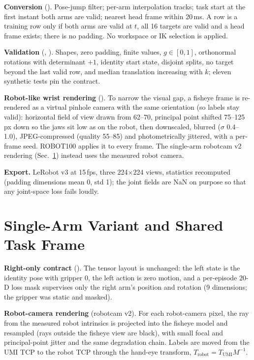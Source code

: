 \documentclass[conference,10pt]{IEEEtran}
\begin{document}
\textbf{Conversion} (). Pose-jump filter; per-arm interpolation tracks; task start at the first instant both arms
are valid; nearest head frame within 20\,ms. A row is a training row only if both arms are valid at $t$, all 16 targets are valid
and a head frame exists; there is no padding. No workspace or IK selection is applied.

\textbf{Validation} (, ). Shapes, zero padding, finite values, $g\in[0,1]$, orthonormal rotations with
determinant $+1$, identity start state, disjoint splits, no target beyond the last valid row, and median translation increasing with
$k$; eleven synthetic tests pin the contract.

\textbf{Robot-like wrist rendering} (). To narrow the visual gap, a fisheye frame is
re-rendered as a virtual pinhole camera with the same orientation (so labels stay valid): horizontal field of view drawn from
62--70\textdegree, principal point shifted 75--125\,px down so the jaws sit low as on the robot, then downscaled, blurred
($\sigma$ 0.4--1.0), JPEG-compressed (quality 55--85) and photometrically jittered, with a per-frame seed. ROBOT100 applies it to
every frame. The single-arm robotcam v2 rendering (Sec.~\ref{m:sec:hra}) instead uses the measured robot camera.

\textbf{Export.} LeRobot v3 at 15\,fps, three 224$\times$224 views, statistics recomputed (padding dimensions mean 0, std 1); the
joint fields are NaN on purpose so that any joint-space loss fails loudly.

\section{Single-Arm Variant and Shared Task Frame}\label{m:sec:hra}
\textbf{Right-only contract} (). The tensor layout is unchanged: the left state is the identity pose with
gripper 0, the left action is zero motion, and a per-episode 20-D loss mask supervises only the right arm's position and rotation
(9 dimensions; the gripper was static and masked).

\textbf{Robot-camera rendering} (robotcam v2). For each robot-camera pixel, the ray from the measured robot intrinsics is projected
into the fisheye model and resampled (rays outside the fisheye view are black), with small focal and principal-point jitter and the
same degradation chain. Labels are moved from the UMI TCP to the robot TCP through the hand-eye transform, $T_\text{robot}=T_\text{UMI}M^{-1}$.
\end{document}
